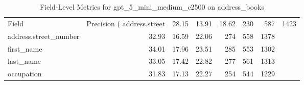 \begin{table}
\caption{Field-Level Metrics for gpt_5_mini_medium_c2500 on address_books}
\label{tab:fields_gpt_5_mini_medium_c2500_address_books}
\begin{tabular}{lrrrrrr}
\toprule
Field & Precision (%
\midrule
address.street & 28.15 & 13.91 & 18.62 & 230 & 587 & 1423 \\
address.street_number & 32.93 & 16.59 & 22.06 & 274 & 558 & 1378 \\
first_name & 34.01 & 17.96 & 23.51 & 285 & 553 & 1302 \\
last_name & 33.05 & 17.42 & 22.82 & 277 & 561 & 1313 \\
occupation & 31.83 & 17.13 & 22.27 & 254 & 544 & 1229 \\
\bottomrule
\end{tabular}
\end{table}
